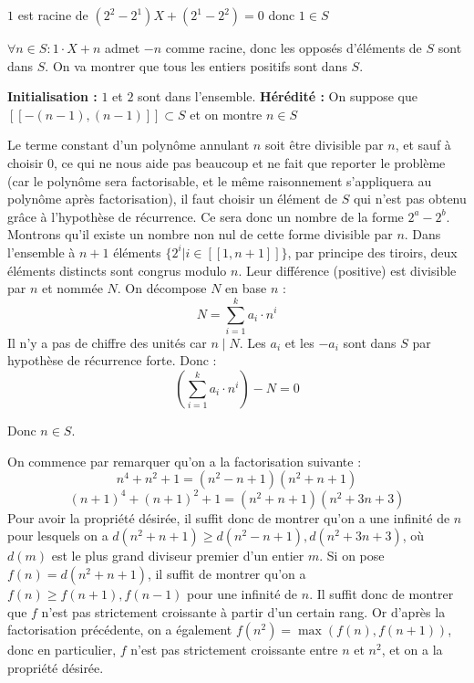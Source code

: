 \begin{sol}
$1$ est racine de $(2^2 - 2^1)X + (2^1 - 2^2) = 0$ donc $1\in S$

$\forall n\in S : 1\cdot X + n$ admet $ - n$ comme racine, donc les opposés d'éléments de $S$ sont dans $S$. On va montrer que tous les entiers positifs sont dans $S$.


\textbf{Initialisation :} $1$ et $2$ sont dans l'ensemble.
\textbf{Hérédité :} On suppose que $[\![ - (n - 1), (n - 1)]\!]\subset S$ et on montre $n\in S$

Le terme constant d'un polynôme annulant $n$ soit être divisible par $n$, et sauf à choisir $0$, ce qui ne nous aide pas beaucoup et ne fait que reporter le problème (car le polynôme sera factorisable, et le même raisonnement s'appliquera au polynôme après factorisation), il faut choisir un élément de $S$ qui n'est pas obtenu grâce à l'hypothèse de récurrence. Ce sera donc un nombre de la forme $2^a - 2^b$. Montrons qu'il existe un nombre non nul de cette forme divisible par $n$. Dans l'ensemble à $n + 1$ éléments $\{2^i|i\in[\![1, n + 1]\!]\}$, par principe des tiroirs, deux éléments distincts sont congrus modulo $n$. Leur différence (positive) est divisible par $n$ et nommée $N$. On décompose $N$ en base $n$ : $$N = \sum_{i = 1}^k a_i\cdot n^i$$
Il n'y a pas de chiffre des unités car $n\mid N$. Les $a_i$ et les $ - a_i$ sont dans $S$ par hypothèse de récurrence forte.
Donc : $$\left(\sum_{i = 1}^k a_i\cdot n^i\right) - N = 0$$

Donc $n\in S$.
\end{sol}


\begin{sol}
On commence par remarquer qu'on a la factorisation suivante :
$$n^4 + n^2 + 1 = (n^2 - n + 1)(n^2 + n + 1)$$
$$(n + 1)^4 + (n + 1)^2 + 1 = (n^2 + n + 1)(n^2 + 3n + 3)$$
Pour avoir la propriété désirée, il suffit donc de montrer qu'on a une infinité de $n$ pour lesquels on a $d(n^2 + n + 1)\ge d(n^2 - n + 1), d(n^2 + 3n + 3)$, où $d(m)$ est le plus grand diviseur premier d'un entier $m$. Si on pose $f(n) = d(n^2 + n + 1)$, il suffit de montrer qu'on a $f(n)\ge f(n + 1), f(n - 1)$ pour une infinité de $n$. Il suffit donc de montrer que $f$ n'est pas strictement croissante à partir d'un certain rang. Or d'après la factorisation précédente, on a également $f(n^2) = \max(f(n), f(n + 1))$, donc en particulier, $f$ n'est pas strictement croissante entre $n$ et $n^2$, et on a la propriété désirée. 
\end{sol}


